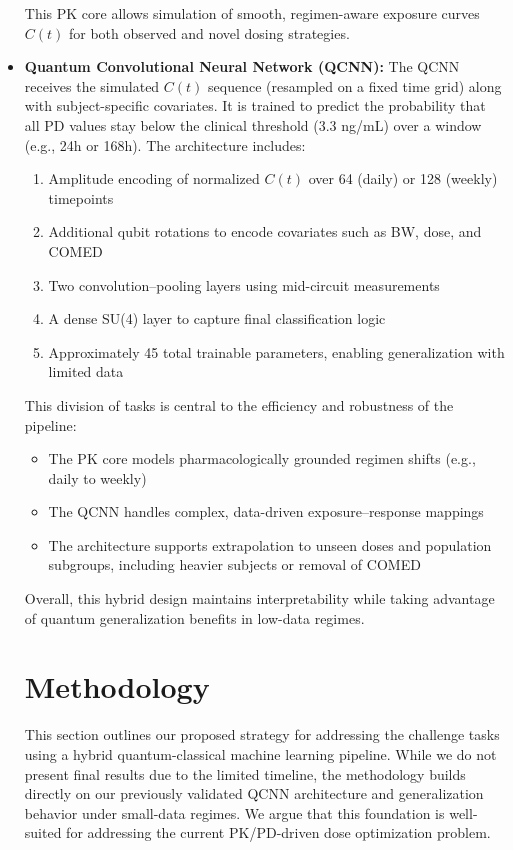 \documentclass[11pt]{article}
\begin{document}
\begin{itemize}
    This PK core allows simulation of smooth, regimen-aware exposure curves \( C(t) \) for both observed and novel dosing strategies.

    \item \textbf{Quantum Convolutional Neural Network (QCNN):} The QCNN receives the simulated \( C(t) \) sequence (resampled on a fixed time grid) along with subject-specific covariates. It is trained to predict the probability that all PD values stay below the clinical threshold (3.3 ng/mL) over a window (e.g., 24h or 168h). The architecture includes:
    \begin{enumerate}[label=\textbf{\alph*)}]
    \item Amplitude encoding of normalized \( C(t) \) over 64 (daily) or 128 (weekly) timepoints
    \item Additional qubit rotations to encode covariates such as BW, dose, and COMED
    \item Two convolution–pooling layers using mid-circuit measurements
    \item A dense SU(4) layer to capture final classification logic
    \item Approximately 45 total trainable parameters, enabling generalization with limited data
\end{enumerate}


This division of tasks is central to the efficiency and robustness of the pipeline:
\begin{itemize}[label=\textbullet]
    \item The PK core models pharmacologically grounded regimen shifts (e.g., daily to weekly)
    \item The QCNN handles complex, data-driven exposure–response mappings
    \item The architecture supports extrapolation to unseen doses and population subgroups, including heavier subjects or removal of COMED
\end{itemize}

Overall, this hybrid design maintains interpretability while taking advantage of quantum generalization benefits in low-data regimes.

\section{Methodology}

This section outlines our proposed strategy for addressing the challenge tasks using a hybrid quantum-classical machine learning pipeline. While we do not present final results due to the limited timeline, the methodology builds directly on our previously validated QCNN architecture and generalization behavior under small-data regimes. We argue that this foundation is well-suited for addressing the current PK/PD-driven dose optimization problem.


\end{itemize}
\end{document}

